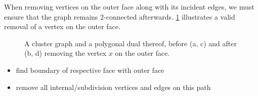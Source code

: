 When removing vertices on the outer face along with its incident edges, we must ensure that the graph remains 2-connected afterwards. \cref{fig:remove-vertex-example-external} illustrates a valid removal of a vertex on the outer face.

\begin{figure}[H]
	\centering
	\quad
	\qquad
	\quad
	\caption{A cluster graph and a polygonal dual thereof, before (a, c) and after (b, d) removing the vertex $x$ on the outer face.}
	\label{fig:remove-vertex-example-external}
\end{figure}

\begin{itemize}
	\item find boundary of respective face with outer face
	\item remove all internal/subdivision vertices and edges on this path
\end{itemize}

\lipsum
